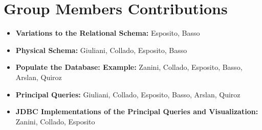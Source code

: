 \documentclass{article}
\begin{document}
\maketitle






\section{Group Members Contributions}
\begin{itemize}
	\item \textbf{Variations to the Relational Schema:} Esposito, Basso
	\item \textbf{Physical Schema:} Giuliani, Collado, Esposito, Basso
	\item \textbf{Populate the Database: Example:} Zanini, Collado, Esposito, Basso, Arslan, Quiroz
	\item \textbf{Principal Queries:} Giuliani, Collado, Esposito, Basso, Arslan, Quiroz
	\item \textbf{JDBC Implementations of the Principal Queries and Visualization:} Zanini, Collado, Esposito
\end{itemize}
\end{document}
